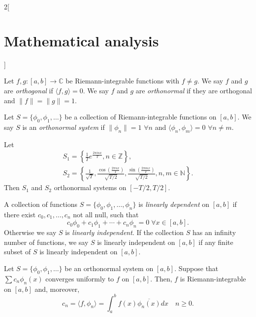\documentclass[class=article,crop=false]{standalone}
\begin{document}
\begin{multicols}{2}[\section{Mathematical analysis}]
\begin{theorem}
\end{theorem}
\begin{definition}
Let $f,g:[a,b]\rightarrow\mathbb{C}$ be Riemann-integrable functions with $f\ne g$. We say $f$ and $g$ are \textit{orthogonal} if $\langle f,g\rangle=0$. We say $f$ and $g$ are \textit{orthonormal} if they are orthogonal and $\|f\|=\|g\|=1$.
\end{definition}
\begin{definition}
Let $S=\{\phi_0,\phi_1,\ldots\}$ be a collection of Riemann-integrable functions on $[a,b]$. We say $S$ is an \textit{orthonormal system} if $\|\phi_n\|=1$ $\forall n$ and $\langle\phi_n,\phi_m\rangle=0$ $\forall n\ne m$.
\end{definition}
\begin{prop}
Let \begin{gather*}
    S_1=\left\{\frac{1}{T}e^{\frac{2\pi inx}{T}},n\in\mathbb{Z}\right\},\\ S_2=\left\{\frac{1}{\sqrt{T}},\frac{\cos\left(\frac{2\pi nx}{T}\right)}{\sqrt{T/2}},\frac{\sin\left(\frac{2\pi mx}{T}\right)}{\sqrt{T/2}},n,m\in\mathbb{N}\right\}.
\end{gather*} Then $S_1$ and $S_2$ orthonormal systems on $[-T/2,T/2]$.
\end{prop}
\begin{definition}
A collection of functions $S=\{\phi_0,\phi_1,\ldots,\phi_n\}$ is \textit{linearly dependent} on $[a,b]$ if there exist $c_0,c_1,\ldots,c_n$ not all null, such that $$c_0\phi_0+c_1\phi_1+\cdots+c_n\phi_n=0\;\forall x\in[a,b].$$ Otherwise we say $S$ is \textit{linearly independent}. If the collection $S$ has an infinity number of functions, we say $S$ is linearly independent on $[a,b]$ if any finite subset of $S$ is linearly independent on $[a,b]$.
\end{definition}
\begin{theorem}
Let $S=\{\phi_0,\phi_1,\ldots\}$ be an orthonormal system on $[a,b]$. Suppose that $\sum c_n\phi_n(x)$ converges uniformly to $f$ on $[a,b]$. Then, $f$ is Riemann-integrable on $[a,b]$ and, moreover, $$c_n=\langle f,\phi_n\rangle=\int_a^bf(x)\overline{\phi_n(x)}dx\quad n\geq 0.$$
\end{theorem}

\end{multicols}
\end{document}
